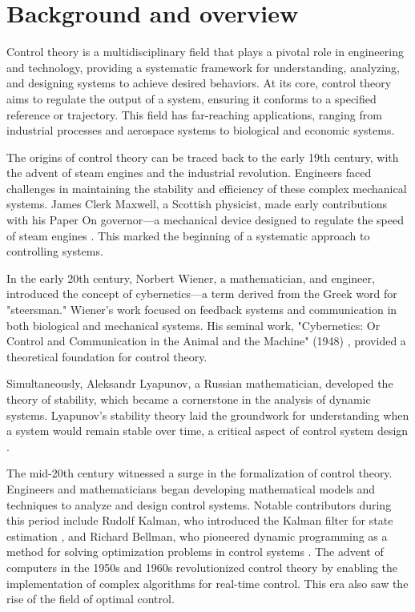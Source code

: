 \graphicspath{ {Figures/chapter01} }
\section{Background and overview}
Control theory is a multidisciplinary field that plays a pivotal role in engineering and technology, providing a systematic framework for understanding, analyzing, and designing systems to achieve desired behaviors. At its core, control theory aims to regulate the output of a system, ensuring it conforms to a specified reference or trajectory. This field has far-reaching applications, ranging from industrial processes and aerospace systems to biological and economic systems.

The origins of control theory can be traced back to the early 19th century, with the advent of steam engines and the industrial revolution. Engineers faced challenges in maintaining the stability and efficiency of these complex mechanical systems. James Clerk Maxwell, a Scottish physicist, made early contributions with his Paper On governor—a mechanical device designed to regulate the speed of steam engines \cite{maxwell1868governors}. This marked the beginning of a systematic approach to controlling systems.

In the early 20th century, Norbert Wiener, a mathematician, and engineer, introduced the concept of cybernetics—a term derived from the Greek word for "steersman." Wiener's work focused on feedback systems and communication in both biological and mechanical systems. His seminal work, "Cybernetics: Or Control and Communication in the Animal and the Machine" (1948) \cite{wiener2019cybernetics}, provided a theoretical foundation for control theory.

Simultaneously, Aleksandr Lyapunov, a Russian mathematician, developed the theory of stability, which became a cornerstone in the analysis of dynamic systems. Lyapunov's stability theory laid the groundwork for understanding when a system would remain stable over time, a critical aspect of control system design \cite{lyapunov1992general}. 

The mid-20th century witnessed a surge in the formalization of control theory. Engineers and mathematicians began developing mathematical models and techniques to analyze and design control systems. Notable contributors during this period include Rudolf Kalman, who introduced the Kalman filter for state estimation \cite{kalman1960contributions}, and Richard Bellman, who pioneered dynamic programming as a method for solving optimization problems in control systems \cite{bellman1966dynamic}. The advent of computers in the 1950s and 1960s revolutionized control theory by enabling the implementation of complex algorithms for real-time control. This era also saw the rise of the field of optimal control.

